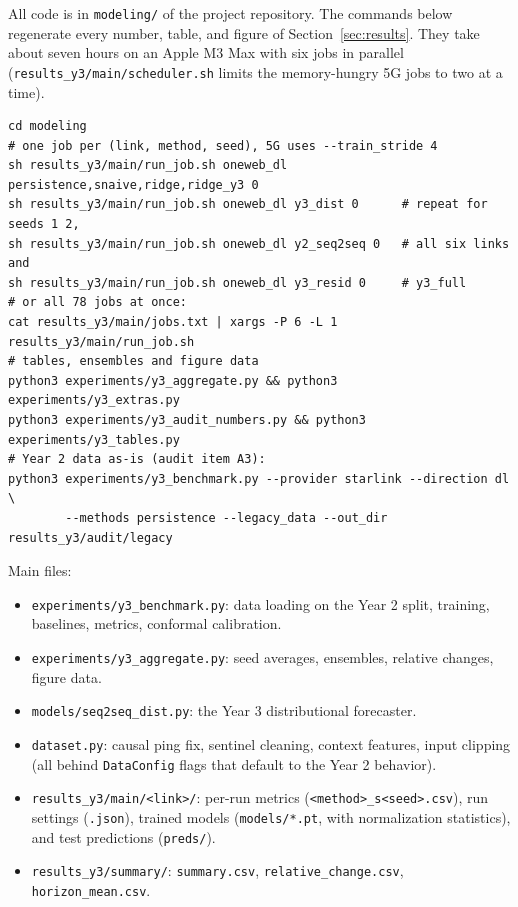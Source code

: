 All code is in \texttt{modeling/\allowbreak{}} of the project repository. The commands below regenerate every number, table, and figure of Section~\ref{sec:results}. They take about seven hours on an Apple M3 Max with six jobs in parallel (\texttt{results\_y3/main/scheduler.sh} limits the memory-hungry 5G jobs to two at a time).

\begin{small}
\begin{verbatim}
cd modeling
# one job per (link, method, seed), 5G uses --train_stride 4
sh results_y3/main/run_job.sh oneweb_dl persistence,snaive,ridge,ridge_y3 0
sh results_y3/main/run_job.sh oneweb_dl y3_dist 0      # repeat for seeds 1 2,
sh results_y3/main/run_job.sh oneweb_dl y2_seq2seq 0   # all six links and
sh results_y3/main/run_job.sh oneweb_dl y3_resid 0     # y3_full
# or all 78 jobs at once:
cat results_y3/main/jobs.txt | xargs -P 6 -L 1 results_y3/main/run_job.sh
# tables, ensembles and figure data
python3 experiments/y3_aggregate.py && python3 experiments/y3_extras.py
python3 experiments/y3_audit_numbers.py && python3 experiments/y3_tables.py
# Year 2 data as-is (audit item A3):
python3 experiments/y3_benchmark.py --provider starlink --direction dl \
        --methods persistence --legacy_data --out_dir results_y3/audit/legacy
\end{verbatim}
\end{small}

\noindent Main files:
\begin{itemize}[leftmargin=*]
  \item \texttt{experiments/\allowbreak{}y3\_\allowbreak{}benchmark.py}: data loading on the Year 2 split, training, baselines, metrics, conformal calibration.
  \item \texttt{experiments/\allowbreak{}y3\_\allowbreak{}aggregate.py}: seed averages, ensembles, relative changes, figure data.
  \item \texttt{models/\allowbreak{}seq2seq\_\allowbreak{}dist.py}: the Year 3 distributional forecaster.
  \item \texttt{dataset.py}: causal ping fix, sentinel cleaning, context features, input clipping (all behind \texttt{DataConfig} flags that default to the Year 2 behavior).
  \item \texttt{results\_\allowbreak{}y3/\allowbreak{}main/\allowbreak{}<link>/\allowbreak{}}: per-run metrics (\texttt{<method>\_\allowbreak{}s<seed>.csv}), run settings (\texttt{.json}), trained models (\texttt{models/\allowbreak{}*.pt}, with normalization statistics), and test predictions (\texttt{preds/\allowbreak{}}).
  \item \texttt{results\_\allowbreak{}y3/\allowbreak{}summary/\allowbreak{}}: \texttt{summary.csv}, \texttt{relative\_\allowbreak{}change.csv}, \texttt{horizon\_\allowbreak{}mean.csv}.
\end{itemize}
